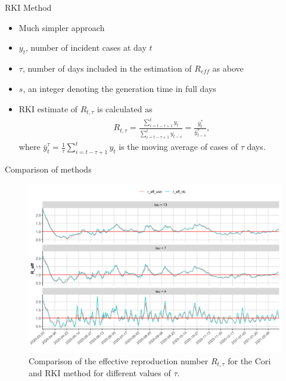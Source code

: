 \documentclass[
  ignorenonframetext,
  aspectratio=169,
]{beamer}
\newcommand{\mli}[1]{\mathit{#1}}%
\begin{document}
\begin{frame}{RKI Method}
\protect\hypertarget{rki-method}{}
\begin{itemize}
\item Much simpler approach
\item $y_t$, number of incident cases at day $t$
\item $\tau$, number of days included in the estimation of $R_\mli{eff}$ as above
\item $s$, an integer denoting the generation time in full days
\item RKI estimate of $R_{t,\tau}$ is calculated as
\begin{align*}
  R_{t,\tau} = \frac{\sum_{i=t-\tau+1}^{t} y_t}{\sum_{i=t-\tau+1}^{t} y_{t-s}} = \frac{\bar{y}_t^\tau}{\bar{y}_{t-s}^\tau},
\end{align*}
where $\bar{y}_t^\tau = \frac{1}{\tau} \sum_{i=t-\tau+1}^{t} y_t$ is the moving average of cases of $\tau$ days. 
\end{itemize}
\end{frame}

\begin{frame}{Comparison of methods}
\protect\hypertarget{comparison-of-methods}{}
\begin{figure}
  \centering
  \includegraphics[height=0.8\textheight,keepaspectratio]{img/fig_r_eff_rki_cori_2021-02-23.png}
  \caption{Comparison of the effective reproduction number $R_{t,\tau}$ for the Cori and RKI method for different values of $\tau$.}
\end{figure}
\end{frame}
\end{document}
